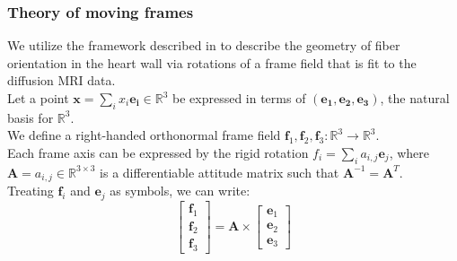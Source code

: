 \subsubsection{Theory of moving frames}

We utilize the framework described in \cite{de1990ventricular} to describe the geometry of fiber orientation in the heart wall via rotations of a frame field that is fit to the diffusion MRI data. \\
Let a point $\mathbf{x} = \sum_i{x_i\mathbf{e_i}} \in \mathbb{R}^3$ be expressed in terms of $(\mathbf{e_1}, \mathbf{e_2}, \mathbf{e_3})$, the natural basis for $\mathbb{R}^3$. \\
We define a right-handed orthonormal frame field $\mathbf{f}_1,\mathbf{f}_2,\mathbf{f}_3 : \mathbb{R}^3 \to \mathbb{R}^3$. \\ 
Each frame axis can be expressed by the rigid rotation $f_i = \sum_i{a_{i,j}\mathbf{e}_j}$, where $\mathbf{A} = {a_{i,j}} \in \mathbb{R}^{3 \times 3}$ is a differentiable attitude matrix such that $\mathbf{A}^{-1} = \mathbf{A}^T$. \\
Treating $\mathbf{f}_i$ and $\mathbf{e}_j$ as symbols, we can write:
\begin{equation}
\begin{bmatrix}
    \mathbf{f}_1 \\
    \mathbf{f}_2 \\
    \mathbf{f}_3
\end{bmatrix} = \mathbf{A} \times \begin{bmatrix}
    \mathbf{e}_1 \\
    \mathbf{e}_2 \\
    \mathbf{e}_3
\end{bmatrix}
\end{equation}

